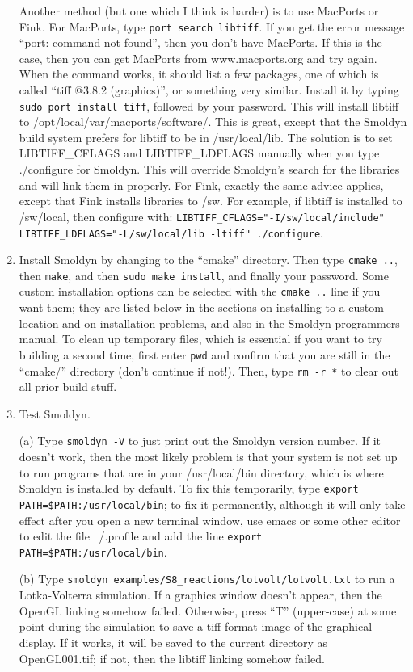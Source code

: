 \documentclass {scrbook}
\newcommand {\ttt} {\texttt}
\begin{document}
\begin{enumerate}
Another method (but one which I think is harder) is to use MacPorts or Fink. For MacPorts, type \ttt{port search libtiff}. If you get the error message ``port: command not found'', then you don't have MacPorts. If this is the case, then you can get MacPorts from www.macports.org and try again. When the command works, it should list a few packages, one of which is called ``tiff @3.8.2 (graphics)'', or something very similar. Install it by typing \ttt{sudo port install tiff}, followed by your password. This will install libtiff to /opt/local/var/macports/software/. This is great, except that the Smoldyn build system prefers for libtiff to be in /usr/local/lib. The solution is to set LIBTIFF\_CFLAGS and LIBTIFF\_LDFLAGS manually when you type ./configure for Smoldyn. This will override Smoldyn's search for the libraries and will link them in properly. For Fink, exactly the same advice applies, except that Fink installs libraries to /sw. For example, if libtiff is installed to /sw/local, then configure with: \ttt{LIBTIFF\_CFLAGS="-I/sw/local/include" LIBTIFF\_LDFLAGS="-L/sw/local/lib -ltiff" ./configure}.

\item Install Smoldyn by changing to the ``cmake'' directory. Then type \ttt{cmake ..}, then \ttt{make}, and then \ttt{sudo make install}, and finally your password. Some custom installation options can be selected with the \ttt{cmake ..} line if you want them; they are listed below in the sections on installing to a custom location and on installation problems, and also in the Smoldyn programmers manual. To clean up temporary files, which is essential if you want to try building a second time, first enter \ttt{pwd} and confirm that you are still in the ``cmake/'' directory (don't continue if not!). Then, type \ttt{rm -r *} to clear out all prior build stuff.

\item Test Smoldyn.

(a) Type \ttt{smoldyn -V} to just print out the Smoldyn version number. If it doesn't work, then the most likely problem is that your system is not set up to run programs that are in your /usr/local/bin directory, which is where Smoldyn is installed by default. To fix this temporarily, type \ttt{export PATH=\$PATH:/usr/local/bin}; to fix it permanently, although it will only take effect after you open a new terminal window, use emacs or some other editor to edit the file ~/.profile and add the line \ttt{export PATH=\$PATH:/usr/local/bin}.

(b) Type \ttt{smoldyn examples/S8\_reactions/lotvolt/lotvolt.txt} to run a Lotka-Volterra simulation. If a graphics window doesn't appear, then the OpenGL linking somehow failed. Otherwise, press ``T'' (upper-case) at some point during the simulation to save a tiff-format image of the graphical display. If it works, it will be saved to the current directory as OpenGL001.tif; if not, then the libtiff linking somehow failed.

\end{enumerate}
\end{document}
